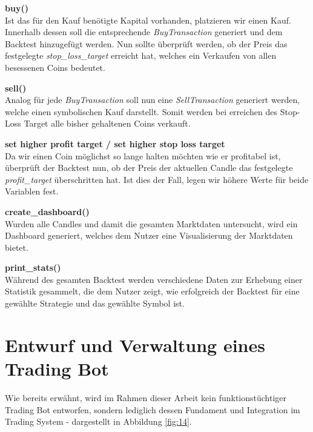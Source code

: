 \documentclass[oneside]{ausarbeitung}
\begin{document}
\textbf{buy()} \\
Ist das für den Kauf benötigte Kapital vorhanden, platzieren wir einen Kauf. Innerhalb dessen soll die entsprechende \textit{BuyTransaction} generiert und dem Backtest hinzugefügt werden. Nun sollte überprüft werden, ob der Preis das festgelegte \textit{stop\_loss\_target} erreicht hat, welches ein Verkaufen von allen besessenen Coins bedeutet.

\textbf{sell()} \\
Analog für jede \textit{BuyTransaction} soll nun eine \textit{SellTransaction} generiert werden, welche einen symbolischen Kauf darstellt. Somit werden bei erreichen des Stop-Loss Target alle bisher gehaltenen Coins verkauft.

\textbf{set higher profit target / set higher stop loss target} \\
Da wir einen Coin möglichst so lange halten möchten wie er profitabel ist, überprüft der Backtest nun, ob der Preis der aktuellen Candle das festgelegte \textit{profit\_target} überschritten hat. Ist dies der Fall, legen wir höhere Werte für beide Variablen fest.

\textbf{create\_dashboard()} \\
Wurden alle Candles und damit die gesamten Marktdaten untersucht, wird ein Dashboard generiert, welches dem Nutzer eine Visualisierung der Marktdaten bietet. 

\textbf{print\_stats()} \\
Während des gesamten Backtest werden verschiedene Daten zur Erhebung einer Statistik gesammelt, die dem Nutzer zeigt, wie erfolgreich der Backtest für eine gewählte Strategie und das gewählte Symbol ist.


\section{Entwurf und Verwaltung eines Trading Bot}
\label{sec:schnittstelle_für_handelsplattformen}

Wie bereits erwähnt, wird im Rahmen dieser Arbeit kein funktionstüchtiger Trading Bot entworfen, sondern lediglich dessen Fundament und Integration im Trading System - dargestellt in Abbildung \ref{fig:14}.
\end{document}

